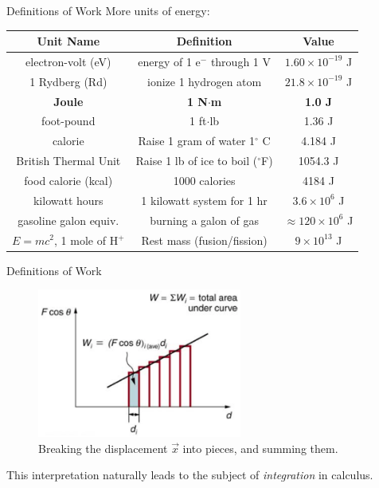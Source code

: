 \documentclass{beamer}
\begin{document}
\begin{frame}{Definitions of Work}
\small
More units of energy:
\begin{table}
\centering
\begin{tabular}{c | c | c}
\alert{Unit Name} & \alert{Definition} & \alert{Value} \\ \hline
electron-volt (eV) & energy of 1 e$^{-}$ through 1 V & $1.60\times 10^{-19}$ J \\ \hline
1 Rydberg (Rd) & ionize 1 hydrogen atom & $21.8\times 10^{-19}$ J \\ \hline
\textbf{Joule} & \textbf{1 N$\cdot$m} & \textbf{1.0 J} \\ \hline
foot-pound & 1 ft$\cdot$lb & 1.36 J \\ \hline 
calorie & Raise 1 gram of water 1$^{\circ}$ C & 4.184 J \\ \hline
British Thermal Unit & Raise 1 lb of ice to boil ($^{\circ}$F) & 1054.3 J \\ \hline
food calorie (kcal) & 1000 calories & 4184 J \\ \hline
kilowatt hours & 1 kilowatt system for 1 hr & $3.6\times 10^6$ J \\ \hline
gasoline galon equiv. & burning a galon of gas & $\approx 120 \times 10^6$ J \\ \hline
$E = mc^2$, 1 mole of H$^{+}$ & Rest mass (fusion/fission) & $9 \times 10^{13}$ J \\ \hline
\end{tabular}
\end{table}
\end{frame}

\begin{frame}{Definitions of Work}
\begin{figure}
\centering
\includegraphics[width=0.6\textwidth]{figures/integral.png}
\caption{\label{fig:work3} Breaking the displacement $\vec{x}$ into pieces, and summing them.}
\end{figure}
\small
This interpretation naturally leads to the subject of \textit{integration} in calculus.  
\end{frame}
\end{document}
